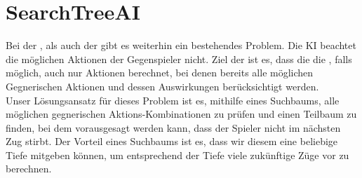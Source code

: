 \section{SearchTreeAI}
\label{sec:searchtree-ai}

Bei der , als auch der  gibt es weiterhin ein bestehendes
Problem.
Die \acs{KI} beachtet die möglichen Aktionen der Gegenspieler nicht.
Ziel der  ist es, dass die die , falls möglich, auch nur Aktionen berechnet,
bei denen bereits alle möglichen Gegnerischen Aktionen und dessen Auswirkungen berücksichtigt werden. \\

Unser Lösungsansatz für dieses Problem ist es, mithilfe eines Suchbaums, alle möglichen gegnerischen
Aktions-Kombinationen zu prüfen und einen Teilbaum zu finden, bei dem vorausgesagt werden kann, dass
der Spieler nicht im nächsten Zug stirbt.
Der Vorteil eines Suchbaums ist es, dass wir diesem eine
beliebige Tiefe mitgeben können, um entsprechend der Tiefe viele zukünftige Züge vor zu berechnen.

